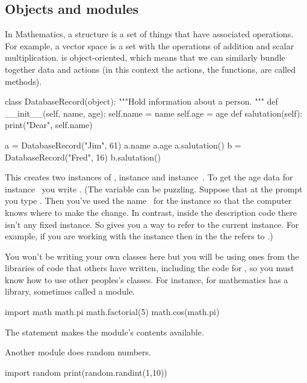 \subsection{Objects and modules}
In Mathematics, a structure is a set of things that have associated operations.
For example, a vector space is a set with the operations
of addition and scalar multiplication.
\python{} is object-oriented, which means that we can similarly bundle
together data and actions (in this context the actions, the functions, 
are called methods).
\begin{pythonconsole}
class DatabaseRecord(object):
    """Hold information about a person.
    """
    def __init__(self, name, age):
        self.name = name
        self.age = age
    def salutation(self):
        print("Dear", self.name)

a = DatabaseRecord("Jim", 61)
a.name
a.age
a.salutation()
b = DatabaseRecord("Fred", 16)
b.salutation()
\end{pythonconsole}
This creates two instances of 
, instance  and
instance~.
To get the age data for instance~
you write 
.
(The \protect{} variable 
can  be puzzling.
Suppose that at the prompt you type .
Then you've used the name~ 
for the instance so that the computer knows where to
make the change.
In contrast,
inside the  description code there isn't any fixed instance. 
So  gives you a way to refer to the current instance. 
For example, if you are working with the instance  then 
in the  the  refers
to .)

You won't be writing your own classes here 
but you will be using ones from
the libraries of code that others have written, including the
code for \Sage, so you must know how to use 
other peoples's classes. 
For instance, for mathematics \python{} has a library, 
sometimes called a module.
\begin{pythonconsole}
import math
math.pi
math.factorial(5)
math.cos(math.pi)
\end{pythonconsole}
The  statement makes the module's
contents available.

Another module does random numbers.
\begin{pythonconsole}
import random
print(random.randint(1,10))

\end{pythonconsole}



